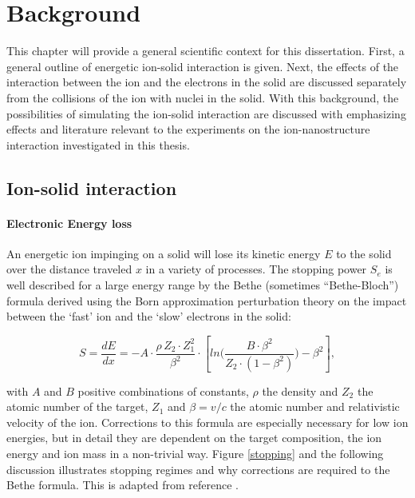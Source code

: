 \chapter{Background}

This chapter will provide a general scientific context for this dissertation. First, a general outline of energetic ion-solid interaction is given. Next, the effects of the interaction between the ion and the electrons in the solid are discussed separately from the collisions of the ion with nuclei in the solid. With this background, the possibilities of simulating the ion-solid interaction are discussed with emphasizing effects and literature relevant to the experiments on the ion-nanostructure interaction investigated in this thesis. 

\section{Ion-solid interaction}
\label{sec:ionsolid}

\subsubsection{Electronic Energy loss}

An energetic ion impinging on a solid will lose its kinetic energy $E$ to the solid over the distance traveled $x$ in a variety of processes. The stopping power $S_e$ is well described for a large energy range by the Bethe (sometimes ``Bethe-Bloch'') formula derived using the Born approximation perturbation theory on the impact between the `fast' ion and the `slow' electrons in the solid: 

\begin{equation}
S = \frac{dE}{dx} = - A \cdot \frac{\rho\,Z_2\cdot Z_1^2}{\beta^2} \cdot \left[ln\Big(\frac{B\cdot\beta^2}{Z_2\cdot(1-\beta^2)}\Big)-\beta^2\right] ,
\end{equation}


with $A$ and $B$ positive combinations of constants, $\rho$ the density and $Z_2$ the atomic number of the target, $Z_1$ and $\beta = v/c$ the atomic number and relativistic velocity of the ion. Corrections to this formula are especially necessary for low ion energies, but in detail they are dependent on the target composition, the ion energy and ion mass in a non-trivial way. Figure \ref{stopping} and the following discussion illustrates stopping regimes and why corrections are required to the Bethe formula. This is adapted from reference \cite{sigmund_stopping_2004}.

